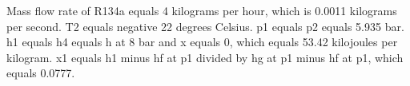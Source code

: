 Mass flow rate of R134a equals 4 kilograms per hour, which is 0.0011 kilograms per second.  
T2 equals negative 22 degrees Celsius.  
p1 equals p2 equals 5.935 bar.  
h1 equals h4 equals h at 8 bar and x equals 0, which equals 53.42 kilojoules per kilogram.  
x1 equals h1 minus hf at p1 divided by hg at p1 minus hf at p1, which equals 0.0777.
